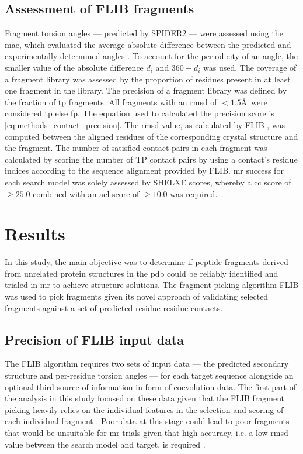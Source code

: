 \subsection{Assessment of FLIB fragments}
Fragment torsion angles --- predicted by SPIDER2 \cite{Heffernan2015-bt} --- were assessed using the \gls{mae}, which evaluated the average absolute difference between the predicted and experimentally determined angles \cite{Heffernan2015-bt}. To account for the periodicity of an angle, the smaller value of the absolute difference $d_i$ and $360-d_i$ was used. The coverage of a fragment library was assessed by the proportion of residues present in at least one fragment in the library. The precision of a fragment library was defined by the fraction of \gls{tp} fragments. All fragments with an \gls{rmsd} of $<1.5$\AA\ were considered \gls{tp} else \gls{fp}. The equation used to calculated the precision score is \cref{eq:methods_contact_precision}. The \gls{rmsd} value, as calculated by FLIB \cite{De_Oliveira2015-kb}, was computed between the aligned residues of the corresponding crystal structure and the fragment. The number of satisfied contact pairs in each fragment was calculated by scoring the number of TP contact pairs by using a contact's residue indices according to the sequence alignment provided by FLIB. \Gls{mr} success for each search model was solely assessed by SHELXE scores, whereby a \gls{cc} score of $\geq25.0$ combined with an \gls{acl} score of $\geq10.0$ was required.

\section{Results}
In this study, the main objective was to determine if peptide fragments derived from unrelated protein structures in the \gls{pdb} could be reliably identified and trialed in \gls{mr} to achieve structure solutions. The fragment picking algorithm FLIB \cite{De_Oliveira2015-kb} was used to pick fragments given its novel approach of validating selected fragments against a set of predicted residue-residue contacts.

\subsection{Precision of FLIB input data}
The FLIB algorithm requires two sets of input data --- the predicted secondary structure and per-residue torsion angles --- for each target sequence alongside an optional third source of information in form of coevolution data. The first part of the analysis in this study focused on these data given that the FLIB fragment picking heavily relies on the individual features in the selection and scoring of each individual fragment \cite{De_Oliveira2015-kb}. Poor data at this stage could lead to poor fragments that would be unsuitable for \gls{mr} trials given that high accuracy, i.e. a low \gls{rmsd} value between the search model and target, is required \cite{Scapin2013-yp}.

